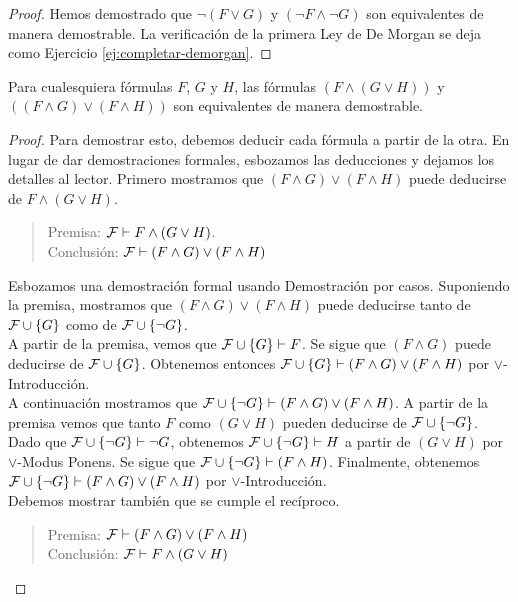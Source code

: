 \message{ !name(main.tex)}\documentclass[12pt,a4paper]{book}
\begin{document}
\begin{proof}
        Hemos demostrado que $\neg(F\vee G)$ y $(\neg F\wedge\neg G)$ son equivalentes de manera demostrable. La verificación de
        la primera Ley de De Morgan se deja como Ejercicio \ref{ej:completar-demorgan}.
    \end{proof}

    \begin{proposicion}\label{prop:distributividad-and-demostrable}
        Para cualesquiera fórmulas $F$, $G$ y $H$, las fórmulas $(F\wedge(G\vee H))$ y $((F\wedge G)\vee(F\wedge H))$ son
        equivalentes de manera demostrable.
    \end{proposicion}
    \begin{proof}
        Para demostrar esto, debemos deducir cada fórmula a partir de la otra. En lugar de dar demostraciones formales,
        esbozamos las deducciones y dejamos los detalles al lector. Primero mostramos que $(F\wedge G)\vee(F\wedge H)$ puede
        deducirse de $F\wedge(G\vee H)$.

        \begin{quote}
            Premisa: $\mathcal{F}\vdash F\wedge(G\vee H)$.\\
            Conclusión: $\mathcal{F}\vdash(F\wedge G)\vee(F\wedge H)$
        \end{quote}

        Esbozamos una demostración formal usando Demostración por casos. Suponiendo la premisa, mostramos que
        $(F\wedge G)\vee(F\wedge H)$ puede deducirse tanto de $\mathcal{F}\cup\{G\}$ como de $\mathcal{F}\cup\{\neg G\}$.\\
        A partir de la premisa, vemos que $\mathcal{F}\cup\{G\}\vdash F$. Se sigue que $(F\wedge G)$ puede deducirse de $\mathcal{F}\cup\{G\}$.
        Obtenemos entonces $\mathcal{F}\cup\{G\}\vdash(F\wedge G)\vee(F\wedge H)$ por $\vee$-Introducción.\\
        A continuación mostramos que $\mathcal{F}\cup\{\neg G\}\vdash(F\wedge G)\vee(F\wedge H)$. A partir de la premisa vemos que tanto
        $F$ como $(G\vee H)$ pueden deducirse de $\mathcal{F}\cup\{\neg G\}$. Dado que $\mathcal{F}\cup\{\neg G\}\vdash\neg G$, obtenemos
        $\mathcal{F}\cup\{\neg G\}\vdash H$ a partir de $(G\vee H)$ por $\vee$-Modus Ponens. Se sigue que
        $\mathcal{F}\cup\{\neg G\}\vdash(F\wedge H)$. Finalmente, obtenemos $\mathcal{F}\cup\{\neg G\}\vdash(F\wedge G)\vee(F\wedge H)$ por
        $\vee$-Introducción.\\
        Debemos mostrar también que se cumple el recíproco.

        \begin{quote}
            Premisa: $\mathcal{F}\vdash(F\wedge G)\vee(F\wedge H)$\\
            Conclusión: $\mathcal{F}\vdash F\wedge(G\vee H)$
        \end{quote}


\end{proof}
\end{document}
